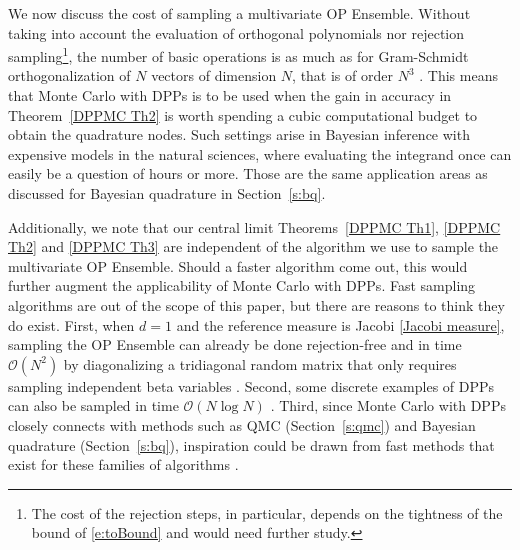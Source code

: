 \documentclass[a4paper,11pt]{article}
\numberwithin{equation}{section}
\theoremstyle{definition}
\newcommand{\rev}[1]{#1}
\newcommand{\cO}{\mathcal{O}}
\newcommand{\red}{\color{red}}
\renewcommand{\phi}{\varphi}
\begin{document}
We now discuss the cost of sampling a multivariate OP Ensemble. Without taking into
account the evaluation of orthogonal polynomials nor rejection sampling\footnote{The cost of the rejection steps, in particular, depends on the tightness of the bound of \eqref{e:toBound} and would need further study.}, the
number of basic operations is as much as for Gram-Schmidt orthogonalization of
$N$ vectors of dimension $N$, that is of order $N^3$ \cite[Section 5.2]{GoVa12}.
This means that Monte Carlo with DPPs is to be used when the gain in accuracy in
Theorem~\ref{DPPMC Th2} is worth spending a cubic computational
 budget to obtain the quadrature nodes. Such settings arise in Bayesian
 inference with expensive models in the natural sciences, where evaluating the
 integrand once can easily be a question of hours or more. Those are the same
 application areas as discussed for Bayesian quadrature in Section~\ref{s:bq}.

\rev{Additionally, we note that our central limit Theorems~\ref{DPPMC Th1}, \ref{DPPMC Th2} and \ref{DPPMC Th3} are independent of the algorithm we use to sample the multivariate OP Ensemble. Should a faster algorithm come out, this would further augment the applicability of Monte Carlo with DPPs.
 Fast sampling algorithms are out of the scope of this paper, but there are
 reasons to think they do exist. First, when $d=1$ and the reference measure is Jacobi \eqref{Jacobi measure}, sampling the OP Ensemble can already be done rejection-free and in time $\mathcal{O}(N^2)$ by diagonalizing a tridiagonal random matrix that only requires sampling independent beta variables \citep{KiNe04}.} Second, some discrete examples
 of DPPs can also be sampled in time $\cO(N\log N)$ \cite[Chapter 4]{LyPe16}.
 Third, since Monte Carlo with DPPs closely connects with methods such as
 QMC (Section~\ref{s:qmc}) and Bayesian quadrature (Section~\ref{s:bq}),
 inspiration could be drawn from fast methods that exist for these families of
 algorithms \citep{DiKuSl13,BaLaOb12,BOGOS15}.


\end{document}
